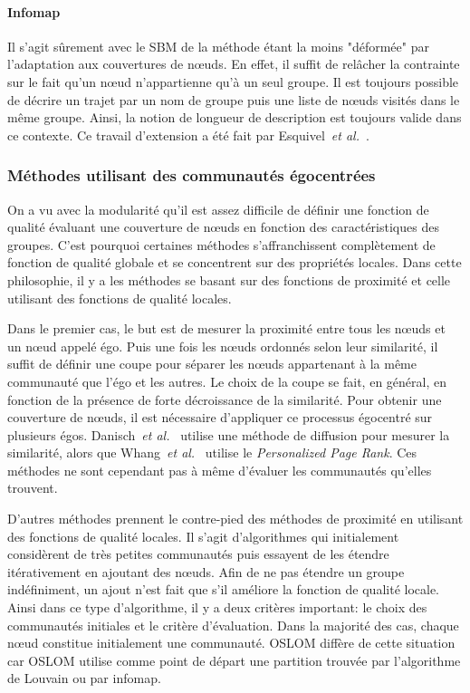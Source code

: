 \paragraph{Infomap}
Il s'agit sûrement avec le SBM de la méthode étant la moins "déformée" par l'adaptation aux couvertures de n\oe{}uds.
En effet, il suffit de relâcher la contrainte sur le fait qu'un n\oe{}ud n'appartienne qu'à un seul groupe.
Il est toujours possible de décrire un trajet par un nom de groupe puis une liste de n\oe{}uds visités dans le même groupe.
Ainsi, la notion de longueur de description est toujours valide dans ce contexte.
Ce travail d'extension a été fait par Esquivel~\emph{et al.}~\cite{Esquivel2011}.

\subsubsection{Méthodes utilisant des communautés égocentrées}
On a vu avec la modularité qu'il est assez difficile de définir une fonction de qualité évaluant une couverture de n\oe{}uds en fonction des caractéristiques des groupes.
C'est pourquoi certaines méthodes s'affranchissent complètement de fonction de qualité globale et se concentrent sur des propriétés locales.
Dans cette philosophie, il y a les méthodes se basant sur des fonctions de proximité et celle utilisant des fonctions de qualité locales.

Dans le premier cas, le but est de mesurer la proximité entre tous les n\oe{}uds et un n\oe{}ud appelé égo.
Puis une fois les n\oe{}uds ordonnés selon leur similarité, il suffit de définir une coupe pour séparer les n\oe{}uds appartenant à la même communauté que l'égo et les autres.
Le choix de la coupe se fait, en général, en fonction de la présence de forte décroissance de la similarité.
Pour obtenir une couverture de n\oe{}uds, il est nécessaire d'appliquer ce processus égocentré sur plusieurs égos.
Danisch~\emph{et al.}~\cite{Danisch2012} utilise une méthode de diffusion pour mesurer la similarité, alors que Whang~\emph{et al.}~\cite{Whang2013} utilise le \emph{Personalized Page Rank}.
Ces méthodes ne sont cependant pas à même d'évaluer les communautés qu'elles trouvent.
\bigskip

D'autres méthodes prennent le contre-pied des méthodes de proximité en utilisant des fonctions de qualité locales.
Il s'agit d'algorithmes qui initialement considèrent de très petites communautés puis essayent de les étendre itérativement en ajoutant des n\oe{}uds.
Afin de ne pas étendre un groupe indéfiniment, un ajout n'est fait que s'il améliore la fonction de qualité locale.
Ainsi dans ce type d'algorithme, il y a deux critères important:
le choix des communautés initiales et le critère d'évaluation.
Dans la majorité des cas, chaque n\oe{}ud constitue initialement une communauté. 
OSLOM\cite{Lancichinetti2011a} diffère de cette situation car OSLOM utilise comme point de départ une partition trouvée par l'algorithme de Louvain ou par infomap.

